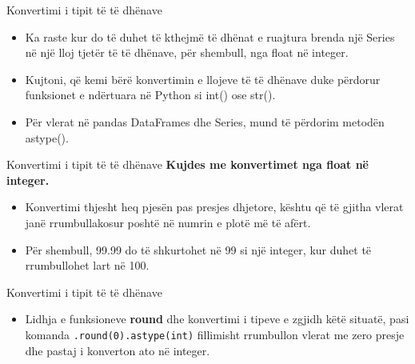\documentclass[
  ignorenonframetext,
]{beamer}
\providecommand{\tightlist}{%
  \setlength{\itemsep}{0pt}\setlength{\parskip}{0pt}}
\begin{document}
\begin{frame}{Konvertimi i tipit të të dhënave}
\protect\hypertarget{konvertimi-i-tipit-tuxeb-tuxeb-dhuxebnave-1}{}
\begin{itemize}
\item
  Ka raste kur do të duhet të kthejmë të dhënat e ruajtura brenda një
  Series në një lloj tjetër të të dhënave, për shembull, nga float në
  integer.
\item
  Kujtoni, që kemi bërë konvertimin e llojeve të të dhënave duke
  përdorur funksionet e ndërtuara në Python si int() ose str().
\item
  Për vlerat në pandas DataFrames dhe Series, mund të përdorim metodën
  astype().
\end{itemize}
\end{frame}

\begin{frame}{Konvertimi i tipit të të dhënave}
\protect\hypertarget{konvertimi-i-tipit-tuxeb-tuxeb-dhuxebnave-2}{}
\textbf{Kujdes me konvertimet nga float në integer.}

\begin{itemize}
\item
  Konvertimi thjesht heq pjesën pas presjes dhjetore, kështu që të
  gjitha vlerat janë rrumbullakosur poshtë në numrin e plotë më të
  afërt.
\item
  Për shembull, 99.99 do të shkurtohet në 99 si një integer, kur duhet
  të rrumbullohet lart në 100.
\end{itemize}
\end{frame}

\begin{frame}[fragile]{Konvertimi i tipit të të dhënave}
\protect\hypertarget{konvertimi-i-tipit-tuxeb-tuxeb-dhuxebnave-3}{}
\begin{itemize}
\tightlist
\item
  Lidhja e funksioneve \textbf{round} dhe konvertimi i tipeve e zgjidh
  këtë situatë, pasi komanda \texttt{.round(0).astype(int)} fillimisht
  rrumbullon vlerat me zero presje dhe pastaj i konverton ato në
  integer.
\end{itemize}
\end{frame}
\end{document}
